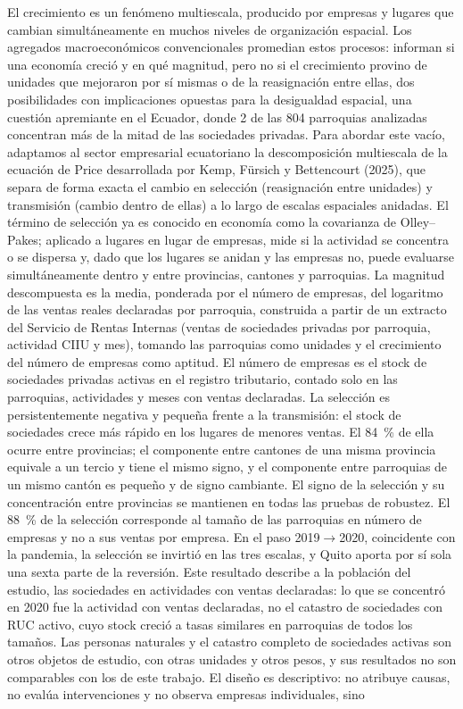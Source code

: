 \documentclass[12pt,a4paper]{article}
\newcommand{\dobleesp}{\setstretch{1.903}} %
\newcommand{\blank}{\par\vspace{13.8pt}}          %
\newcommand{\xii}{\fontsize{12pt}{13.8pt}\selectfont}
\newcommand{\caratula}[1]{\par\vspace{12pt}{\centering\bfseries\xii #1\par}\vspace{18pt}}
\begin{document}
\clearpage
\blank
\caratula{RESUMEN}
\begingroup\dobleesp
\vspace{6pt}
El crecimiento es un fenómeno multiescala, producido por empresas y lugares que cambian simultáneamente en muchos niveles de organización espacial. Los agregados macroeconómicos convencionales promedian estos procesos: informan si una economía creció y en qué magnitud, pero no si el crecimiento provino de unidades que mejoraron por sí mismas o de la reasignación entre ellas, dos posibilidades con implicaciones opuestas para la desigualdad espacial, una cuestión apremiante en el Ecuador, donde 2 de las 804 parroquias analizadas concentran más de la mitad de las sociedades privadas. Para abordar este vacío, adaptamos al sector empresarial ecuatoriano la descomposición multiescala de la ecuación de Price desarrollada por Kemp, Fürsich y Bettencourt (2025), que separa de forma exacta el cambio en selección (reasignación entre unidades) y transmisión (cambio dentro de ellas) a lo largo de escalas espaciales anidadas. El término de selección ya es conocido en economía como la covarianza de Olley--Pakes; aplicado a lugares en lugar de empresas, mide si la actividad se concentra o se dispersa y, dado que los lugares se anidan y las empresas no, puede evaluarse simultáneamente dentro y entre provincias, cantones y parroquias. La magnitud descompuesta es la media, ponderada por el número de empresas, del logaritmo de las ventas reales declaradas por parroquia, construida a partir de un extracto del Servicio de Rentas Internas (ventas de sociedades privadas por parroquia, actividad CIIU y mes), tomando las parroquias como unidades y el crecimiento del número de empresas como aptitud. El número de empresas es el stock de sociedades privadas activas en el registro tributario, contado solo en las parroquias, actividades y meses con ventas declaradas. La selección es persistentemente negativa y pequeña frente a la transmisión: el stock de sociedades crece más rápido en los lugares de menores ventas. El 84~\% de ella ocurre entre provincias; el componente entre cantones de una misma provincia equivale a un tercio y tiene el mismo signo, y el componente entre parroquias de un mismo cantón es pequeño y de signo cambiante. El signo de la selección y su concentración entre provincias se mantienen en todas las pruebas de robustez. El 88~\% de la selección corresponde al tamaño de las parroquias en número de empresas y no a sus ventas por empresa. En el paso 2019$\to$2020, coincidente con la pandemia, la selección se invirtió en las tres escalas, y Quito aporta por sí sola una sexta parte de la reversión. Este resultado describe a la población del estudio, las sociedades en actividades con ventas declaradas: lo que se concentró en 2020 fue la actividad con ventas declaradas, no el catastro de sociedades con RUC activo, cuyo stock creció a tasas similares en parroquias de todos los tamaños. Las personas naturales y el catastro completo de sociedades activas son otros objetos de estudio, con otras unidades y otros pesos, y sus resultados no son comparables con los de este trabajo. El diseño es descriptivo: no atribuye causas, no evalúa intervenciones y no observa empresas individuales, sino 
\end{document}
